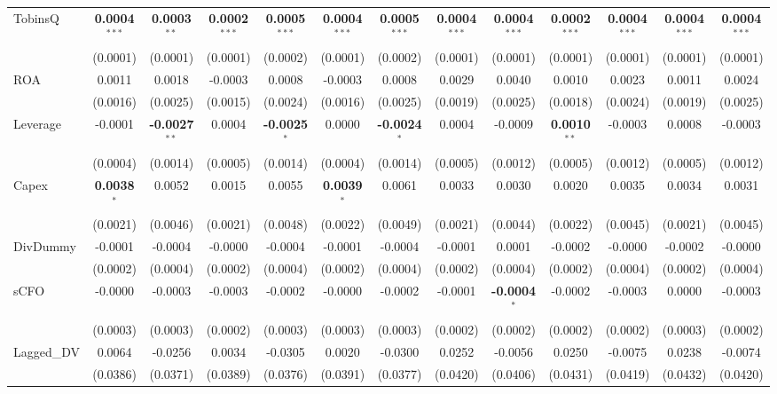 \begin{landscape}
\begin{table}[H]
\begin{tabular}{lcccccccccccc}
TobinsQ & \textbf{0.0004}$^{***}$ & \textbf{0.0003}$^{**}$ & \textbf{0.0002}$^{***}$ & \textbf{0.0005}$^{***}$ & \textbf{0.0004}$^{***}$ & \textbf{0.0005}$^{***}$ & \textbf{0.0004}$^{***}$ & \textbf{0.0004}$^{***}$ & \textbf{0.0002}$^{***}$ & \textbf{0.0004}$^{***}$ & \textbf{0.0004}$^{***}$ & \textbf{0.0004}$^{***}$ \\
 & (0.0001) & (0.0001) & (0.0001) & (0.0002) & (0.0001) & (0.0002) & (0.0001) & (0.0001) & (0.0001) & (0.0001) & (0.0001) & (0.0001) \\
ROA & 0.0011 & 0.0018 & -0.0003 & 0.0008 & -0.0003 & 0.0008 & 0.0029 & 0.0040 & 0.0010 & 0.0023 & 0.0011 & 0.0024 \\
 & (0.0016) & (0.0025) & (0.0015) & (0.0024) & (0.0016) & (0.0025) & (0.0019) & (0.0025) & (0.0018) & (0.0024) & (0.0019) & (0.0025) \\
Leverage & -0.0001 & \textbf{-0.0027}$^{**}$ & 0.0004 & \textbf{-0.0025}$^{*}$ & 0.0000 & \textbf{-0.0024}$^{*}$ & 0.0004 & -0.0009 & \textbf{0.0010}$^{**}$ & -0.0003 & 0.0008 & -0.0003 \\
 & (0.0004) & (0.0014) & (0.0005) & (0.0014) & (0.0004) & (0.0014) & (0.0005) & (0.0012) & (0.0005) & (0.0012) & (0.0005) & (0.0012) \\
Capex & \textbf{0.0038}$^{*}$ & 0.0052 & 0.0015 & 0.0055 & \textbf{0.0039}$^{*}$ & 0.0061 & 0.0033 & 0.0030 & 0.0020 & 0.0035 & 0.0034 & 0.0031 \\
 & (0.0021) & (0.0046) & (0.0021) & (0.0048) & (0.0022) & (0.0049) & (0.0021) & (0.0044) & (0.0022) & (0.0045) & (0.0021) & (0.0045) \\
DivDummy & -0.0001 & -0.0004 & -0.0000 & -0.0004 & -0.0001 & -0.0004 & -0.0001 & 0.0001 & -0.0002 & -0.0000 & -0.0002 & -0.0000 \\
 & (0.0002) & (0.0004) & (0.0002) & (0.0004) & (0.0002) & (0.0004) & (0.0002) & (0.0004) & (0.0002) & (0.0004) & (0.0002) & (0.0004) \\
sCFO & -0.0000 & -0.0003 & -0.0003 & -0.0002 & -0.0000 & -0.0002 & -0.0001 & \textbf{-0.0004}$^{*}$ & -0.0002 & -0.0003 & 0.0000 & -0.0003 \\
 & (0.0003) & (0.0003) & (0.0002) & (0.0003) & (0.0003) & (0.0003) & (0.0002) & (0.0002) & (0.0002) & (0.0002) & (0.0003) & (0.0002) \\
Lagged\_DV & 0.0064 & -0.0256 & 0.0034 & -0.0305 & 0.0020 & -0.0300 & 0.0252 & -0.0056 & 0.0250 & -0.0075 & 0.0238 & -0.0074 \\
 & (0.0386) & (0.0371) & (0.0389) & (0.0376) & (0.0391) & (0.0377) & (0.0420) & (0.0406) & (0.0431) & (0.0419) & (0.0432) & (0.0420) \\

\end{tabular}
\end{table}
\end{landscape}
